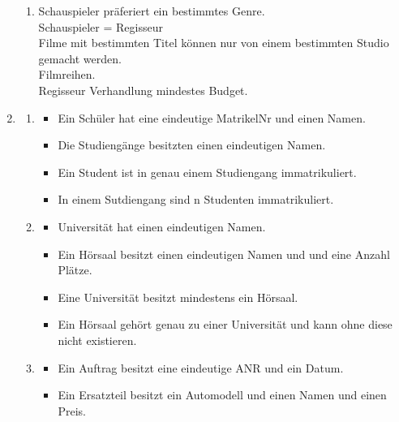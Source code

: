 \documentclass{article}
\begin{document}
\begin{enumerate}
\begin{enumerate}
                        \item 
                            Schauspieler präferiert ein bestimmtes Genre.\\
                            Schauspieler = Regisseur\\
                            Filme mit bestimmten Titel können nur von einem bestimmten Studio gemacht werden.\\
                            Filmreihen.\\
                            Regisseur Verhandlung mindestes Budget.\\
                \end{enumerate} 
        \item
            \begin{enumerate}
                \item  
                    \begin{itemize}
                        \item Ein Schüler hat eine eindeutige MatrikelNr und einen Namen.
                        \item Die Studiengänge besitzten einen eindeutigen Namen.
                        \item Ein Student ist in genau einem Studiengang immatrikuliert.
                        \item In einem Sutdiengang sind n Studenten immatrikuliert.
                    \end{itemize} 
                \item   
                    \begin{itemize}
                        \item Universität hat einen eindeutigen Namen.
                        \item Ein Hörsaal besitzt einen eindeutigen Namen und und eine Anzahl Plätze.
                        \item Eine Universität besitzt mindestens ein Hörsaal.
                        \item Ein Hörsaal gehört genau zu einer Universität und kann ohne diese nicht existieren.
                    \end{itemize}
                \item   
                    \begin{itemize}
                        \item Ein Auftrag besitzt eine eindeutige ANR und ein Datum.
                        \item Ein Ersatzteil besitzt ein Automodell und einen  Namen und einen Preis.

\end{itemize}
\end{enumerate}
\end{enumerate}
\end{document}
